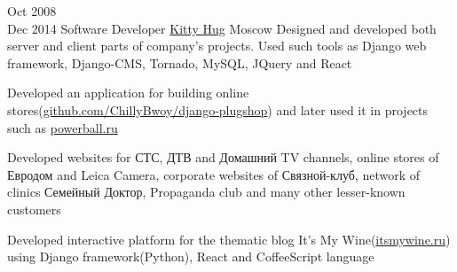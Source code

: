 \documentclass[11pt,a4paper,sans]{moderncv}
\newcommand{\lang}[2]{#2}
\begin{document}
										
										
										
										
		\cventry
		{\lang{Окт}{Oct} 2008\\\lang{Дек}{Dec} 2014}
		{\lang
			{Программист}
			{Software Developer}}
		{\href{http://kittyhug.ru}{Kitty Hug}}
		{\lang
			{Москва}
			{Moscow}}
		{}
		{\lang
			{Занимался разработкой и проектированием как серверной, так и клиентской части проектов компании. Использовал Django, Django-CMS, Tornado, MySQL, JQuery и React, занимался написанием юнит-тестов.}
			{Designed and developed both server and client parts of company's projects. Used such tools as Django web framework, Django-CMS, Tornado, MySQL, JQuery and React}}
										
		\cvlistitem
		{\lang
			{Разработал приложение \href{https://github.com/ChillyBwoy/django-plugshop}{django-plugshop}, на основе которого в дальнейшем было создано несколько интернет-магазинов, например deathstar.ru и \href{http://powerball.ru}{powerball.ru}}
			{Developed an application for building online stores(\href{https://github.com/ChillyBwoy/django-plugshop}{github.com/ChillyBwoy/django-plugshop})} and later used it in projects such as \href{http://powerball.ru}{powerball.ru}}
										
		\cvlistitem
		{\lang
			{Делал сайты для телеканалов СТС, ДТВ и Домашний, интернет-магазина «Евродом», фотоаппаратов «Leica Camera», «Связного-клуба», сети поликлиник «Семейный Доктор», клуба «Пропаганда», кафе «Filial»(\href{http://filialmoscow.com/ru/}{filialmoscow.com}), торгово-офисного центра «Гименей»(\href{http://himeney.ru}{himeney.ru}) и многих других менее известных клиентов}
			{Developed websites for {\textquotedbl}СТС{\textquotedbl}, {\textquotedbl}ДТВ{\textquotedbl} and {\textquotedbl}Домашний{\textquotedbl} TV channels, online stores of {\textquotedbl}Евродом{\textquotedbl} and {\textquotedbl}Leica Camera{\textquotedbl}, corporate websites of {\textquotedbl}Связной-клуб{\textquotedbl}, network of clinics {\textquotedbl}Семейный Доктор{\textquotedbl}, {\textquotedbl}Propaganda club{\textquotedbl} and many other lesser-known customers}}
										
										
		\cvlistitem
		{\lang
			{Разработал интерактивную издательскую платформу для тематического блога «It's My Wine»(\href{http://itsmywine.ru}{itsmywine.ru})}
			{Developed interactive platform for the thematic blog {\textquotedbl}It's My Wine{\textquotedbl}(\href{http://itsmywine.ru}{itsmywine.ru}) using Django framework(Python), React and CoffeeScript language}}
										
\end{document}
